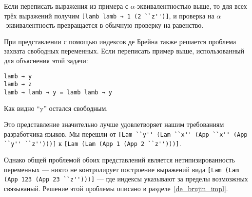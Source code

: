 Если переписать выражения из примера с $\alpha$-эквивалентностью выше, то для всех трёх выражений получим \lstinline{[lamb lamb → 1 (2 ``z'')]}, и проверка на $\alpha$-эквивалентность превращается в обычную проверку на равенство.

При представлении с помощью индексов де Брейна также решается проблема захвата свободных переменных. Если переписать пример выше, использованный для объяснения этой задачи:
\begin{lstlisting}
lamb → y
lamb → z
lamb → lamb → y = lamb lamb → y
\end{lstlisting}

Как видно ``y'' остался свободным.

Это представление значительно лучше удовлетворяет нашим требованиям разработчика языков. Мы перешли от
\lstinline{[Lam ``y'' (Lam ``x'' (App ``x'' (App ``y'' ``z'')))]} к \lstinline{[Lam (Lam (App 1 (App 2 ``z'')))]}.

Однако общей проблемой обоих представлений является нетипизированность переменных --- никто не контролирует построение выражений вида \lstinline{[Lam (Lam (App 123 (App 23 ``z'')))]} --- где индексы указывают за пределы возмозжных связываный. Решение этой проблемы описано в разделе~\ref{de_brujin_impl}.
